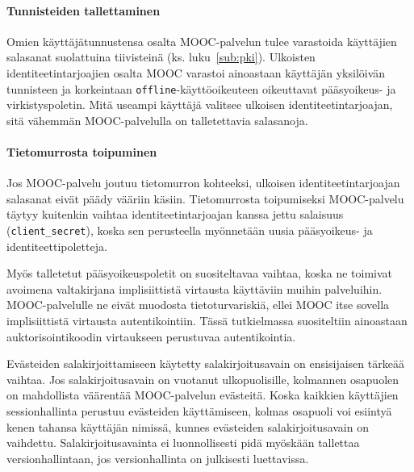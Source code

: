 \documentclass[finnish,gradu]{tktltiki}
\begin{document}

  \paragraph{Tunnisteiden tallettaminen} \hfill %
  \label{par:tietoturva}

  Omien käyttäjätunnustensa osalta MOOC-palvelun tulee varastoida käyttäjien salasanat suolattuina tiivisteinä (ks. luku~\ref{sub:pki}). Ulkoisten identiteetintarjoajien osalta MOOC varastoi ainoastaan käyttäjän yksilöivän tunnisteen ja korkeintaan \verb!offline!-käyttöoikeuteen oikeuttavat pääsyoikeus- ja virkistyspoletin. Mitä useampi käyttäjä valitsee ulkoisen identiteetintarjoajan, sitä vähemmän MOOC-palvelulla on talletettavia salasanoja.


  \paragraph{Tietomurrosta toipuminen} %
  \label{par:tietomurrosta_toipuminen}

  Jos MOOC-palvelu joutuu tietomurron kohteeksi, ulkoisen identiteetintarjoajan salasanat eivät päädy vääriin käsiin. Tietomurrosta toipumiseksi MOOC-palvelu täytyy kuitenkin vaihtaa identiteetintarjoajan kanssa jettu salaisuus (\verb!client_secret!), koska sen perusteella myönnetään uusia pääsyoikeus- ja identiteettipoletteja.

  Myös talletetut pääsyoikeuspoletit on suositeltavaa vaihtaa, koska ne toimivat avoimena valtakirjana implisiittistä virtausta käyttäviin muihin palveluihin. MOOC-palvelulle ne eivät muodosta tietoturvariskiä, ellei MOOC itse sovella implisiittistä virtausta autentikointiin. Tässä tutkielmassa suositeltiin ainoastaan auktorisointikoodin virtaukseen perustuvaa autentikointia.

  Evästeiden salakirjoittamiseen käytetty salakirjoitusavain on ensisijaisen tärkeää vaihtaa. Jos salakirjoitusavain on vuotanut ulkopuolisille, kolmannen osapuolen on mahdollista väärentää MOOC-palvelun evästeitä. Koska kaikkien käyttäjien sessionhallinta perustuu evästeiden käyttämiseen, kolmas osapuoli voi esiintyä kenen tahansa käyttäjän nimissä, kunnes evästeiden salakirjoitusavain on vaihdettu. Salakirjoitusavainta ei luonnollisesti pidä myöskään tallettaa versionhallintaan, jos versionhallinta on julkisesti luettavissa.

\end{document}
